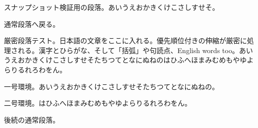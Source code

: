 \documentclass[pdflatex]{jlreq}
\begin{document}
\makeatletter
\begingroup
\edef\snaphsize{\the\hsize}%
\edef\snappi{\the\parindent}%
\edef\snapbs{\the\baselineskip}%
\hsize=333pt
\parindent=20pt
\begin{ptjparagraph}
スナップショット検証用の段落。あいうえおかきくけこさしすせそ。
\end{ptjparagraph}
\ifdim\ptj@par@hsize=333pt\relax\else
  \typeout{STRICT-FAIL: hsize-snapshot (\the\ptj@par@hsize)}\fi
\makeatother
通常段落へ戻る。
\makeatletter
\ifdim\hsize=333pt\else\typeout{STRICT-FAIL: hsize-restored}\fi
\endgroup
\makeatother
\begin{ptjparagraph}
厳密段落テスト。日本語の文章をここに入れる。優先順位付きの伸縮が厳密に処理される。漢字とひらがな、そして「括弧」や句読点、English words too。あいうえおかきくけこさしすせそたちつてとなにぬねのはひふへほまみむめもやゆよらりるれろわをん。
\end{ptjparagraph}
\begin{ptjparagraph}
一号環境。あいうえおかきくけこさしすせそたちつてとなにぬねの。
\end{ptjparagraph}
\begin{ptjparagraph}
二号環境。はひふへほまみむめもやゆよらりるれろわをん。
\end{ptjparagraph}
後続の通常段落。
\makeatletter
{}
\makeatother
\end{document}
